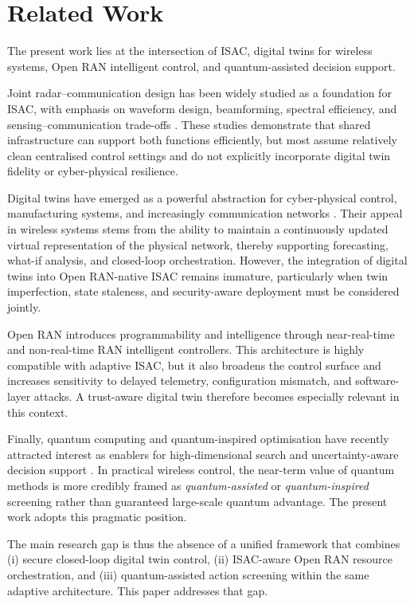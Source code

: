\documentclass[10pt,journal]{IEEEtran}
\begin{document}
\section{Related Work}
\label{sec:related}
The present work lies at the intersection of ISAC, digital twins for wireless systems, Open RAN intelligent control, and quantum-assisted decision support.

Joint radar--communication design has been widely studied as a foundation for ISAC, with emphasis on waveform design, beamforming, spectral efficiency, and sensing--communication trade-offs \cite{b1,b2}. These studies demonstrate that shared infrastructure can support both functions efficiently, but most assume relatively clean centralised control settings and do not explicitly incorporate digital twin fidelity or cyber-physical resilience.

Digital twins have emerged as a powerful abstraction for cyber-physical control, manufacturing systems, and increasingly communication networks \cite{b3}. Their appeal in wireless systems stems from the ability to maintain a continuously updated virtual representation of the physical network, thereby supporting forecasting, what-if analysis, and closed-loop orchestration. However, the integration of digital twins into Open RAN-native ISAC remains immature, particularly when twin imperfection, state staleness, and security-aware deployment must be considered jointly.

Open RAN introduces programmability and intelligence through near-real-time and non-real-time RAN intelligent controllers. This architecture is highly compatible with adaptive ISAC, but it also broadens the control surface and increases sensitivity to delayed telemetry, configuration mismatch, and software-layer attacks. A trust-aware digital twin therefore becomes especially relevant in this context.

Finally, quantum computing and quantum-inspired optimisation have recently attracted interest as enablers for high-dimensional search and uncertainty-aware decision support \cite{b4,b5}. In practical wireless control, the near-term value of quantum methods is more credibly framed as \emph{quantum-assisted} or \emph{quantum-inspired} screening rather than guaranteed large-scale quantum advantage. The present work adopts this pragmatic position.

The main research gap is thus the absence of a unified framework that combines (i) secure closed-loop digital twin control, (ii) ISAC-aware Open RAN resource orchestration, and (iii) quantum-assisted action screening within the same adaptive architecture. This paper addresses that gap.
\end{document}
